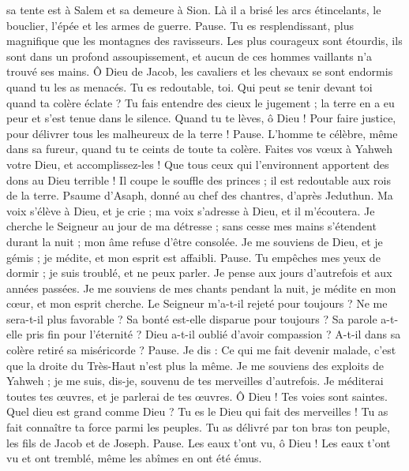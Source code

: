 \begin{multicols}{2}
sa tente est à Salem et sa demeure à Sion.
Là il a brisé les arcs étincelants, le bouclier, l'épée et les armes de guerre. Pause.
Tu es resplendissant, plus magnifique que les montagnes des ravisseurs.
Les plus courageux sont étourdis, ils sont dans un profond assoupissement, et aucun de ces hommes vaillants n'a trouvé ses mains.
Ô Dieu de Jacob, les cavaliers et les chevaux se sont endormis quand tu les as menacés.
Tu es redoutable, toi. Qui peut se tenir devant toi quand ta colère éclate ?
Tu fais entendre des cieux le jugement ; la terre en a eu peur et s'est tenue dans le silence.
Quand tu te lèves, ô Dieu ! Pour faire justice, pour délivrer tous les malheureux de la terre ! Pause.
L’homme te célèbre, même dans sa fureur, quand tu te ceints de toute ta colère.
Faites vos vœux à Yahweh votre Dieu, et accomplissez-les ! Que tous ceux qui l’environnent apportent des dons au Dieu terrible !
Il coupe le souffle des princes ; il est redoutable aux rois de la terre.
\VerseOne{}Psaume d'Asaph, donné au chef des chantres, d'après Jeduthun.
Ma voix s’élève à Dieu, et je crie ; ma voix s'adresse à Dieu, et il m'écoutera.
Je cherche le Seigneur au jour de ma détresse ; sans cesse mes mains s’étendent durant la nuit ; mon âme refuse d'être consolée.
Je me souviens de Dieu, et je gémis ; je médite, et mon esprit est affaibli. Pause.
Tu empêches mes yeux de dormir ; je suis troublé, et ne peux parler.
Je pense aux jours d'autrefois et aux années passées.
Je me souviens de mes chants pendant la nuit, je médite en mon cœur, et mon esprit cherche.
Le Seigneur m'a-t-il rejeté pour toujours ? Ne me sera-t-il plus favorable ?
Sa bonté est-elle disparue pour toujours ? Sa parole a-t-elle pris fin pour l’éternité ?
Dieu a-t-il oublié d'avoir compassion ? A-t-il dans sa colère retiré sa miséricorde ? Pause.
Je dis : Ce qui me fait devenir malade, c’est que la droite du Très-Haut n’est plus la même.
Je me souviens des exploits de Yahweh ; je me suis, dis-je, souvenu de tes merveilles d'autrefois.
Je méditerai toutes tes œuvres, et je parlerai de tes œuvres.
Ô Dieu ! Tes voies sont saintes. Quel dieu est grand comme Dieu ?
Tu es le Dieu qui fait des merveilles ! Tu as fait connaître ta force parmi les peuples.
Tu as délivré par ton bras ton peuple, les fils de Jacob et de Joseph. Pause.
Les eaux t'ont vu, ô Dieu ! Les eaux t'ont vu et ont tremblé, même les abîmes en ont été émus.

\end{multicols}
